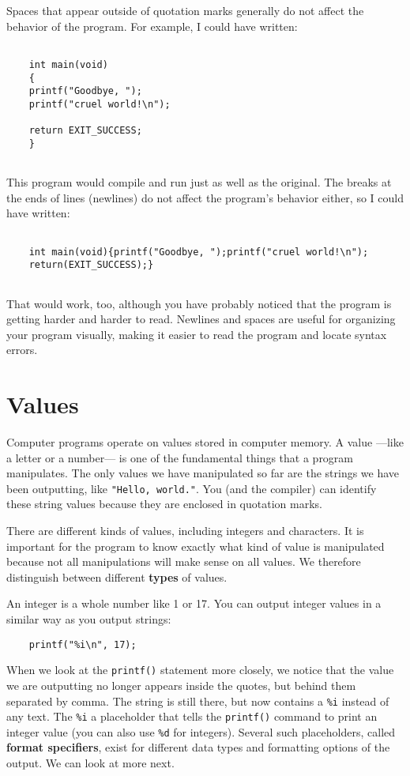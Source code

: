 Spaces that appear outside of quotation marks generally do
not affect the behavior of the program.  For example, I
could have written:

\begin{verbatim}

    int main(void)
    {
    printf("Goodbye, ");
    printf("cruel world!\n");
    	     
    return EXIT_SUCCESS;
    }
    
\end{verbatim}
%
This program would compile and run just as well as the original.
The breaks at the ends of lines (newlines) do not affect
the program's behavior either, so I could have written:

\begin{verbatim}

    int main(void){printf("Goodbye, ");printf("cruel world!\n");
    return(EXIT_SUCCESS);}
    
\end{verbatim}
%
That would work, too, although you have probably noticed that
the program is getting harder and harder to read.  Newlines and
spaces are useful for organizing your program visually, making
it easier to read the program and locate syntax errors.

\section{Values}

Computer programs operate on values stored in 
computer memory.
A value ---like a letter or
a number--- is one of the fundamental things that a program manipulates.  
The only values we have
manipulated so far are the strings we have been outputting, like
{\tt "Hello, world."}.  You (and the compiler) can identify
these string values because they are enclosed in quotation marks.

There are different kinds of values, including integers and characters.
It is important for the program to know exactly what kind of value
is manipulated because not all manipulations will make sense on all
values.
We therefore distinguish between different {\bf types} of values.  

An integer is a whole number like 1 or 17.  You can output
integer values in a similar way as you output strings:

\begin{verbatim}
    printf("%i\n", 17);
\end{verbatim}
%
When we look at the \texttt{printf()} statement more closely, we
notice that the value we are outputting no longer appears
inside the quotes, but behind them separated by comma.
The string is still there, but now contains a {\tt \%i} instead of
any text. 
The {\tt \%i} a placeholder that tells the \texttt{printf()} command
to print an integer value (you can also use {\tt \%d} for integers). 
Several such placeholders, called {\bf format specifiers}, exist
for different data types and formatting options of the output. 
We can look at more next.

